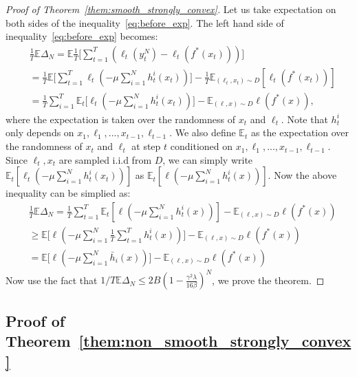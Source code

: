 \begin{proof}[Proof of Theorem~\ref{them:smooth_strongly_convex}]
Let us take expectation on both sides of the inequality~\ref{eq:before_exp}. The left hand side of inequality~\ref{eq:before_exp} becomes:
\begin{align}
&\frac{1}{T}\mathbb{E}\Delta_N = \mathbb{E}\frac{1}{T}\big[\sum_{t=1}^T (\ell_t(y_t^N) - \ell_t(f^*(x_t)))\big] \\
&=\frac{1}{T} \mathbb{E}\big[\sum_{t=1}^T\ell_t(-\mu\sum_{i=1}^N h_t^{i}(x_t))\big] - \frac{1}{T}\mathbb{E}_{(\ell_t,x_t)\sim D}[\ell_t(f^*(x_t))] \nonumber\\
& = \frac{1}{T}\sum_{i=1}^T\mathbb{E}_t\big[\ell_t(-\mu\sum_{i=1}^N h_t^i(x_t))\big] - \mathbb{E}_{(\ell,x)\sim D}\ell(f^*(x)),
\end{align} where the expectation is taken over the randomness of $x_t$ and $\ell_t$. Note that $h_t^i$ only depends on $x_1,\ell_1,...,x_{t-1},\ell_{t-1}$. We also define $\mathbb{E}_t$ as the expectation over the randomness of $x_t$ and $\ell_t$ at step $t$ conditioned on $x_{1}, \ell_1, ..., x_{t-1},\ell_{t-1}$. Since $\ell_t, x_t$ are sampled i.i.d from $D$, we can simply write $\mathbb{E}_t[\ell_t(-\mu\sum_{i=1}^N h_t^i(x_t))]$ as $\mathbb{E}_t[\ell(-\mu\sum_{i=1}^N h_t^i(x))]$. Now the above inequality can be simplied as:
\begin{align}
&\frac{1}{T}\mathbb{E}\Delta_N = \frac{1}{T}\sum_{t=1}^T \mathbb{E}_t[\ell(-\mu\sum_{i=1}^N h_t^i(x))] - \mathbb{E}_{(\ell,x)\sim D}\ell(f^*(x)) \nonumber\\
&\geq \mathbb{E}\big[\ell(-\mu\sum_{i=1}^N\frac{1}{T}\sum_{t=1}^T h_t^i(x))\big] - \mathbb{E}_{(\ell,x)\sim D}\ell(f^*(x)) \nonumber\\
& = \mathbb{E}\big[\ell(-\mu\sum_{i=1}^N \bar{h}_i(x))\big] - \mathbb{E}_{(\ell,x)\sim D}\ell(f^*(x))
\end{align}
Now use the fact that $1/T\mathbb{E}\Delta_N \leq 2B(1-\frac{\gamma^2\lambda}{16\beta})^N$, we prove the theorem.
\end{proof}

\subsection{Proof of Theorem~\ref{them:non_smooth_strongly_convex}}
\label{sec:proof_non_smooth_strongly_convex}

